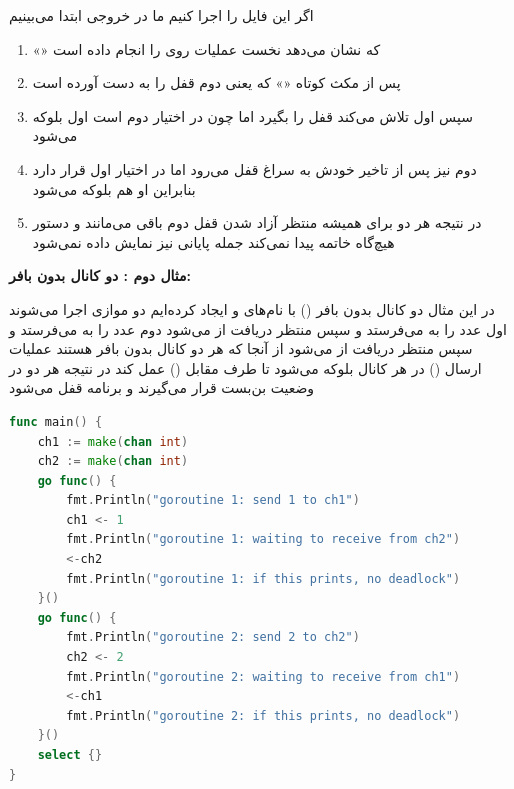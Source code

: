\noindent
اگر این فایل را اجرا کنیم ما در خروجی ابتدا می‌بینیم
\begin{enumerate}
    \item «» که نشان می‌دهد  نخست عملیات  روی  را انجام داده است
    \item پس از مکث کوتاه «» که یعنی  دوم قفل  را به دست آورده است
    \item سپس  اول تلاش می‌کند قفل  را بگیرد اما چون  در اختیار  دوم است  اول بلوکه می‌شود
    \item {} دوم نیز پس از تاخیر خودش به سراغ قفل  می‌رود اما  در اختیار  اول قرار دارد بنابراین او هم بلوکه می‌شود
    \item در نتیجه هر دو  برای همیشه منتظر آزاد شدن قفل دوم باقی می‌مانند و دستور  هیچ‌گاه خاتمه پیدا نمی‌کند جمله پایانی نیز نمایش داده نمی‌شود
\end{enumerate}

\bigskip

\textbf{مثال دوم : دو کانال بدون بافر:}

در این مثال دو کانال بدون بافر () با نام‌های  و  ایجاد کرده‌ایم دو  موازی اجرا می‌شوند  اول عدد  را به  می‌فرستد و سپس منتظر دریافت از  می‌شود  دوم عدد  را به  می‌فرستد و سپس منتظر دریافت از  می‌شود از آنجا که هر دو کانال بدون بافر هستند عملیات ارسال () در هر کانال بلوکه می‌شود تا طرف مقابل () عمل کند در نتیجه هر دو  در وضعیت بن‌بست قرار می‌گیرند و برنامه قفل می‌شود

\medskip

\begin{latin}
\begin{lstlisting}[language=Go]
func main() {
    ch1 := make(chan int)
    ch2 := make(chan int)
    go func() {
        fmt.Println("goroutine 1: send 1 to ch1")
        ch1 <- 1
        fmt.Println("goroutine 1: waiting to receive from ch2")
        <-ch2
        fmt.Println("goroutine 1: if this prints, no deadlock")
    }()
    go func() {
        fmt.Println("goroutine 2: send 2 to ch2")
        ch2 <- 2
        fmt.Println("goroutine 2: waiting to receive from ch1")
        <-ch1
        fmt.Println("goroutine 2: if this prints, no deadlock")
    }()
    select {}
}
\end{lstlisting}
\end{latin}

